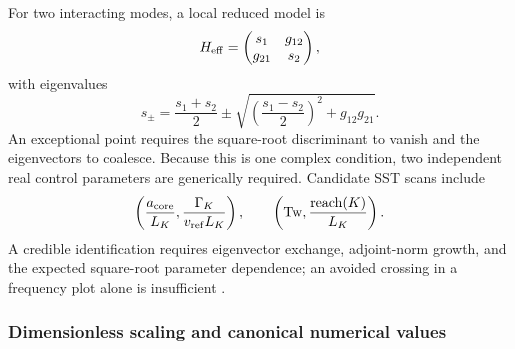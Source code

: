        For two interacting modes, a local reduced model is
        \begin{equation}
            H_{\rm eff}
            =
            \begin{pmatrix}
                s_1 & g_{12}\\
                g_{21} & s_2
            \end{pmatrix},
        \end{equation}
        with eigenvalues
        \begin{equation}
            s_\pm
            =
            \frac{s_1+s_2}{2}
            \pm
            \sqrt{
                \left(
                    \frac{s_1-s_2}{2}
                \right)^2
                +
                g_{12}g_{21}
            }.
            \label{eq:rt_qss_two_mode_eigenvalues}
        \end{equation}
        An exceptional point requires the square-root discriminant to vanish and the
        eigenvectors to coalesce.  Because this is one complex condition, two
        independent real control parameters are generically required.  Candidate SST
        scans include
        \begin{equation}
            \left(
                \frac{a_{\rm core}}{L_K},
                \frac{\Gamma_K}{v_{\rm ref}L_K}
            \right),
            \qquad
            \left(
                \mathrm{Tw},
                \frac{\operatorname{reach}(K)}{L_K}
            \right).
        \end{equation}
        A credible identification requires eigenvector exchange, adjoint-norm growth,
        and the expected square-root parameter dependence; an avoided crossing in a
        frequency plot alone is insufficient
        \cite{BertiEtAl2026BlackHoleSpectroscopy}.

    \subsubsection*{Dimensionless scaling and canonical numerical values}

